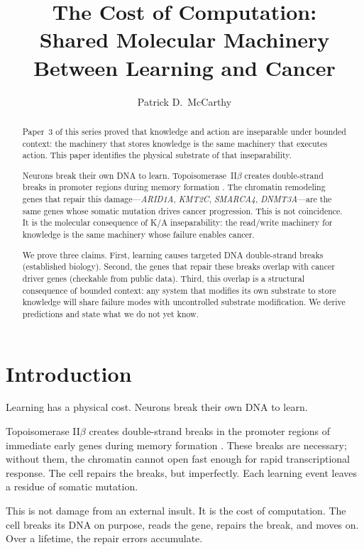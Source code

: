 \documentclass[11pt]{article}
\title{The Cost of Computation:\\Shared Molecular Machinery Between Learning and Cancer}
\author{Patrick D.\ McCarthy}
\date{}
\theoremstyle{definition}
\begin{document}
\maketitle

\begin{abstract}
Paper~3 of this series proved that knowledge and action are
inseparable under bounded context: the machinery that stores
knowledge is the same machinery that executes action. This paper
identifies the physical substrate of that inseparability.

Neurons break their own DNA to learn. Topoisomerase~II$\beta$
creates double-strand breaks in promoter regions during memory
formation \cite{Madabhushi2015}. The chromatin remodeling genes
that repair this damage---\emph{ARID1A}, \emph{KMT2C},
\emph{SMARCA4}, \emph{DNMT3A}---are the same genes whose somatic
mutation drives cancer progression. This is not coincidence. It is
the molecular consequence of K/A inseparability: the read/write
machinery for knowledge is the same machinery whose failure
enables cancer.

We prove three claims. First, learning causes targeted DNA
double-strand breaks (established biology). Second, the genes that
repair these breaks overlap with cancer driver genes (checkable
from public data). Third, this overlap is a structural consequence
of bounded context: any system that modifies its own substrate to
store knowledge will share failure modes with uncontrolled
substrate modification. We derive predictions and state what we do
not yet know.
\end{abstract}

\section{Introduction}
\label{sec:intro}

Learning has a physical cost. Neurons break their own DNA to learn.

Topoisomerase II$\beta$ creates double-strand breaks in the promoter
regions of immediate early genes during memory formation
\cite{Madabhushi2015}. These breaks are necessary; without them,
the chromatin cannot open fast enough for rapid transcriptional
response. The cell repairs the breaks, but imperfectly.
Each learning event leaves a residue of somatic mutation.

This is not damage from an external insult. It is the cost of
computation. The cell breaks its DNA on purpose, reads the gene,
repairs the break, and moves on. Over a lifetime, the repair
errors accumulate.
\end{document}
